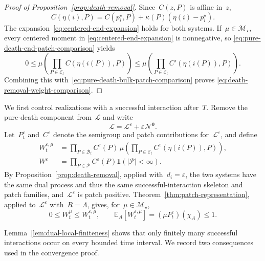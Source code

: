 \documentclass[EJP,preprint,NODS,nobera]{ejpecp}
\newcommand{\E}{\mathbb{E}}
\newcommand{\bb}[1]{\left(#1\right)}
\newcommand{\Cb}[1]{\left[#1\right]}
\newcommand{\abs}[1]{\left|#1\right|}
\newcommand{\ind}{\mathbf{1}}
\newcommand{\mb}[1]{\mathbf{#1}}
\newcommand{\Lcal}{\mathcal{L}}
\newcommand{\Ncal}{\mathcal{N}}
\newcommand{\rev}[1]{{\color{red}#1}}
\begin{document}
\begin{proof}[Proof of Proposition~\ref{prop:death-removal}]
Since~$C(z,P)$ is affine in~$z$,
\begin{equation*}
C\bb{\eta(i),P}
=
C\bb{p_i^\star,P}
+
\kappa(P)\bb{\eta(i)-p_i^\star}.
\end{equation*}
The expansion~\eqref{eq:centered-end-expansion} holds for both systems.
If~$\mu\in\mathcal M_\star$, every centered moment in
\eqref{eq:centered-end-expansion} is nonnegative, so
\eqref{eq:pure-death-end-patch-comparison} yields
\begin{equation*}
0
\leq
\mu\bb{
\prod_{P\in\mathcal E_t}
C\bb{\eta\bb{i(P)},P}
}
\leq
\mu\bb{
\prod_{P\in\mathcal E_t}
C'\bb{\eta\bb{i(P)},P}
}.
\end{equation*}
Combining this with~\eqref{eq:pure-death-bulk-patch-comparison} proves
\eqref{eq:death-removal-weight-comparison}.
\end{proof}

We first control realizations with a successful interaction after~$T$. Remove
the pure-death component from~$\Lcal$ and write
\begin{equation}
\label{eq:uniform-death-decomposition}
\Lcal
=
\Lcal^\varepsilon
+
\varepsilon\Ncal^{\mb 0}.
\end{equation}
Let~$P_t^\varepsilon$ and~$C^\varepsilon$ denote the semigroup and patch
contributions for~$\Lcal^\varepsilon$, and define
\begin{align*}
W_t^{\varepsilon,\mu}
&=
\prod_{P\in\mathcal B_t}C^\varepsilon(P)\,
\mu\bb{
\prod_{P\in\mathcal E_t}
C^\varepsilon\bb{\eta\bb{i(P)},P}
},
\\
W^\varepsilon
&=
\prod_{P\in\mathcal P}C^\varepsilon(P)
\ind\bb{\abs{\mathcal P}<\infty}.
\end{align*}
By Proposition~\ref{prop:death-removal}, applied with~$d_i=\varepsilon$, the two systems have the
same dual process and thus the same successful-interaction skeleton and patch families,
and~$\Lcal^\varepsilon$ is patch positive. \rev{Theorem~\ref{thm:patch-representation}, applied to~$\Lcal^\varepsilon$ with~$R=\Lambda$, gives}, for~$\mu\in\mathcal M_\star$,
\begin{equation}
\label{eq:death-removed-weight-comparison}
0\leq W_t^\mu\leq W_t^{\varepsilon,\mu},
\qquad
\E_A\Cb{W_t^{\varepsilon,\mu}}
=
(\mu P_t^\varepsilon)(\chi_A)
\leq1.
\end{equation}

Lemma~\ref{lem:dual-local-finiteness} shows that only finitely many
successful interactions occur on every bounded time interval. We record two
consequences used in the convergence proof.
\end{document}
